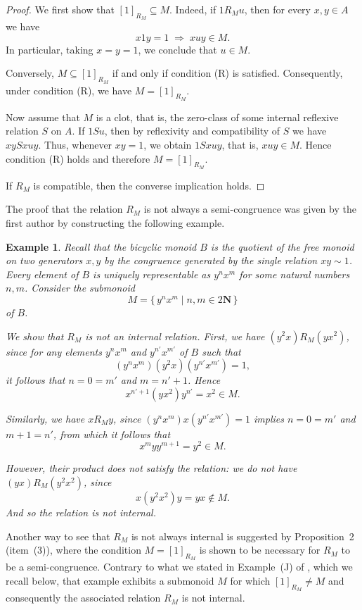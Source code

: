 \documentclass[12pt]{article}
\newtheorem{example}{Example}
\begin{document}
\begin{proof}
We first show that $[1]_{R_M} \subseteq M$. Indeed, if $1 R_M u$, then for every $x,y\in A$ we have
\[
x1y = 1 \;\Rightarrow\; xuy \in M.
\]
In particular, taking $x=y=1$, we conclude that $u\in M$.

Conversely, $M \subseteq [1]_{R_M}$ if and only if condition (R) is satisfied. Consequently, under condition (R), we have
$M = [1]_{R_M}$.

Now assume that $M$ is a clot, that is, the zero-class of some internal reflexive relation $S$ on $A$. If $1Su$, then by reflexivity and compatibility of $S$ we have $xySxuy$. Thus, whenever $xy=1$, we obtain $1Sxuy$, that is, $xuy\in M$. Hence condition (R) holds and therefore $M=[1]_{R_M}$.

If $R_M$ is compatible, then the converse implication holds.
\end{proof}

The proof that the relation $R_M$ is not always a semi-congruence was given by the first author by constructing the following example.

\begin{example} \label{example: bicyclic}\em
Recall that the {\em bicyclic} monoid $B$ is the quotient of the free monoid on two generators $x,y$ by the congruence generated by the single relation $xy\sim 1$. Every element of $B$ is uniquely representable as $y^n x^m$ for some natural numbers $n,m$. Consider the submonoid
\[
M=\{\,y^n x^m \mid n,m\in 2\mathbf{N}\,\}
\]
of $B$.

We show that $R_M$ is not an internal relation. First, we have $(y^2x) R_M (yx^2)$, since for any elements $y^n x^m$ and $y^{n'} x^{m'}$ of $B$ such that
\[
(y^n x^m)(y^2x)(y^{n'} x^{m'})=1,
\]
it follows that $n=0=m'$ and $m=n'+1$. Hence
\[
x^{n'+1}(yx^2)y^{n'}=x^2\in M.
\]

Similarly, we have $x R_M y$, since $(y^n x^m)x(y^{n'} x^{m'})=1$ implies $n=0=m'$ and $m+1=n'$, from which it follows that
\[
x^m y y^{m+1}=y^2\in M.
\]

However, their product does not satisfy the relation: we do not have $(yx) R_M (y^2x^2)$, since
\[
x(y^2x^2)y=yx\notin M.
\]
And so the relation is not internal.
\end{example}

Another way to see that $R_M$ is not always internal is suggested by Proposition~2 (item~(3)), where the condition $M = [1]_{R_M}$ is shown to be necessary for $R_M$ to be a semi-congruence. Contrary to what we stated in Example~(J) of \cite{MFS3}, which we recall below, that example exhibits a submonoid $M$ for which $[1]_{R_M} \neq M$ and consequently  the associated relation $R_M$ is not internal.
\end{document}
